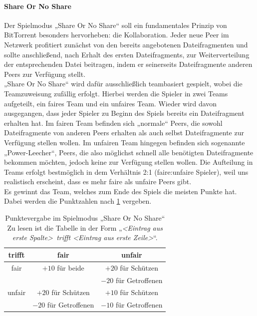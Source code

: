 \paragraph{Share Or No Share}
Der Spielmodus „Share Or No Share“ soll ein fundamentales Prinzip von BitTorrent besonders hervorheben: die Kollaboration. Jeder neue Peer im Netzwerk profitiert zunächst von den bereits angebotenen Dateifragmenten und sollte anschließend, nach Erhalt des ersten Dateifragments, zur Weiterverteilung der entsprechenden Datei beitragen, indem er seinerseits Dateifragmente anderen Peers zur Verfügung stellt. \\
„Share Or No Share“ wird dafür ausschließlich teambasiert gespielt, wobei die Teamzuweisung zufällig erfolgt. Hierbei werden die Spieler in zwei Teams aufgeteilt, ein faires Team und ein unfaires Team. Wieder wird davon ausgegangen, dass jeder Spieler zu Beginn des Spiels bereits ein Dateifragment erhalten hat. Im fairen Team befinden sich „normale“ Peers, die sowohl Dateifragmente von anderen Peers erhalten als auch selbst Dateifragmente zur Verfügung stellen wollen. Im unfairen Team hingegen befinden sich sogenannte „Power-Leecher“, Peers, die also möglichst schnell alle benötigten Dateifragmente bekommen möchten, jedoch keine zur Verfügung stellen wollen. Die Aufteilung in Teams erfolgt bestmöglich in dem Verhältnis 2:1 (faire:unfaire Spieler), weil uns realistisch erscheint, dass es mehr faire als unfaire Peers gibt. \\
Es gewinnt das Team, welches zum Ende des Spiels die meisten Punkte hat. Dabei werden die Punktzahlen nach \cref{tab:share-or-no-share-punkte} vergeben.
\begin{table}
  \centering
  \begin{tabular}{|c|c|c|}\hline
      trifft & fair & unfair \\ \hline
      fair & $+10$ für beide & $+20$ für Schützen \\
       & & $-20$ für Getroffenen \\ \hline
      unfair & $+20$ für Schützen & $+10$ für Schützen \\
       & $-20$ für Getroffenen & $-10$ für Getroffenen \\ \hline
  \end{tabular}
  \caption{Punktevergabe im Spielmodus „Share Or No Share“ \\
           \footnotesize Zu lesen ist die Tabelle in der Form „\emph{\textless Eintrag aus erste Spalte\textgreater\ trifft \textless Eintrag aus erste Zeile\textgreater}“.}
  \label{tab:share-or-no-share-punkte}
\end{table}

